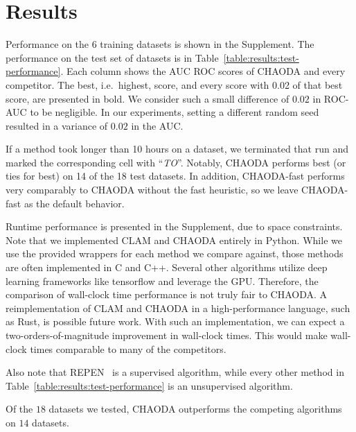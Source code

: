 \section{Results}
\label{sec:results}

Performance on the 6 training datasets is shown in the Supplement.
The performance on the test set of datasets is in Table~\ref{table:results:test-performance}.
Each column shows the AUC ROC scores of CHAODA and every competitor.
The best, i.e.\ highest, score, and every score with 0.02 of that best score, are presented in bold.
We consider such a small difference of $0.02$ in ROC-AUC to be negligible.
In our experiments, setting a different random seed resulted in a variance of $0.02$ in the AUC.

If a method took longer than 10 hours on a dataset, we terminated that run and marked the corresponding cell with ``\textit{TO}''.
Notably, CHAODA performs best (or ties for best) on 14 of the 18 test datasets.
In addition, CHAODA-fast performs very comparably to CHAODA without the fast heuristic, so we leave CHAODA-fast as the default behavior.

Runtime performance is presented in the Supplement, due to space constraints. 
Note that we implemented CLAM and CHAODA entirely in Python.
While we use the provided wrappers for each method we compare against, those methods are often implemented in C and C++.
Several other algorithms utilize deep learning frameworks like tensorflow and leverage the GPU.
Therefore, the comparison of wall-clock time performance is not truly fair to CHAODA.
A reimplementation of CLAM and CHAODA in a high-performance language, such as Rust, is possible future work.
With such an implementation, we can expect a two-orders-of-magnitude improvement in wall-clock times.
This would make wall-clock times comparable to many of the competitors.

Also note that REPEN~\cite{pang2018learning} is a supervised algorithm, while every other method in Table~\ref{table:results:test-performance} is an unsupervised algorithm.

Of the $18$ datasets we tested, CHAODA outperforms the competing algorithms on $14$ datasets.


